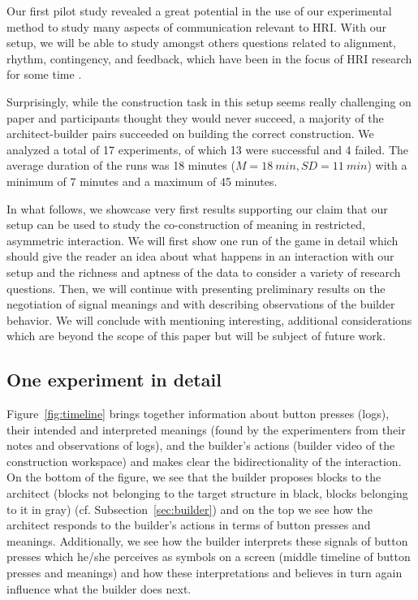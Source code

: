 Our first pilot study revealed a great potential in the use of our experimental method to study many aspects of communication relevant to HRI. With our setup, we will be able to study amongst others questions related to alignment, rhythm, contingency, and feedback, which have been in the focus of HRI research for some time \cite{kopp2010social,michalowski2007dancing,fischer2013impact,vollmer2014robots,pitsch2013robot,wrede2010appropriate}.

Surprisingly, while the construction task in this setup seems really challenging on paper and participants thought they would never succeed, a majority of the architect-builder pairs succeeded on building the correct construction. We analyzed a total of 17 experiments, of which 13 were successful and 4 failed. The average duration of the runs was 18 minutes ($M = 18~min, SD = 11~min$) with a minimum of 7 minutes and a maximum of 45 minutes.

In what follows, we showcase very first results supporting our claim that our setup can be used to study the co-construction of meaning in restricted, asymmetric interaction. We will first show one run of the game in detail which should give the reader an idea about what happens in an interaction with our setup and the richness and aptness of the data to consider a variety of research questions. Then, we will continue with presenting preliminary results on the negotiation of signal meanings and with describing observations of the builder behavior. We will conclude with mentioning interesting, additional considerations which are beyond the scope of this paper but will be subject of future work.

\subsection{One experiment in detail} 
\label{sec:case}
Figure~\ref{fig:timeline} brings together information about button presses (logs), their intended and interpreted meanings (found by the experimenters from their notes and observations of logs), and the builder's actions (builder video of the construction workspace) and makes clear the bidirectionality of the interaction. On the bottom of the figure, we see that the builder proposes blocks to the architect (blocks not belonging to the target structure in black, blocks belonging to it in gray) (cf. Subsection~\ref{sec:builder}) and on the top we see how the architect responds to the builder's actions in terms of button presses and meanings. Additionally, we see how the builder interprets these signals of button presses which he/she perceives as symbols on a screen (middle timeline of button presses and meanings) and how these interpretations and believes in turn again influence what the builder does next.


